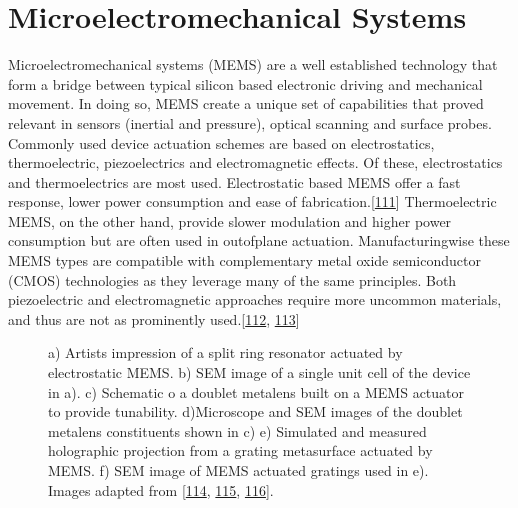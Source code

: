 \documentclass[a4paper,10pt,english,openany,oneside]{jupyterBook}
\begin{document}
\section{Micro\sphinxhyphen{}electromechanical Systems}
\label{\detokenize{sota:micro-electromechanical-systems}}
\sphinxAtStartPar
Micro\sphinxhyphen{}electromechanical systems (MEMS) are a well established technology that form a bridge between typical silicon based electronic driving and mechanical movement. In doing so, MEMS create a unique set of capabilities that proved relevant in sensors (inertial and pressure), optical scanning and surface probes. Commonly used device actuation schemes are based on electrostatics, thermoelectric, piezoelectrics and electromagnetic effects. Of these, electrostatics and thermoelectrics are most used. Electrostatic based MEMS offer a fast response, lower power consumption and ease of fabrication.{[}\hyperlink{cite.bib:id275}{111}{]} Thermoelectric MEMS, on the other hand, provide slower modulation and higher power consumption but are often used in out\sphinxhyphen{}of\sphinxhyphen{}plane actuation. Manufacturing\sphinxhyphen{}wise these MEMS types are compatible with complementary metal oxide semiconductor (CMOS) technologies as they leverage many of the same principles. Both piezoelectric and electromagnetic approaches require more uncommon materials, and thus are not as prominently used.{[}\hyperlink{cite.bib:id283}{112}, \hyperlink{cite.bib:id371}{113}{]}

\begin{figure}[htbp]
\centering
\capstart

\noindent{}
\caption{a) Artists impression of a split ring resonator actuated by electrostatic MEMS. b) SEM image of a single unit cell of the device in a). c) Schematic o a doublet metalens built on a MEMS actuator to provide tunability. d)Microscope and SEM images of the doublet metalens constituents shown in c) e) Simulated and measured holographic projection from a grating metasurface actuated by MEMS. f) SEM image of MEMS actuated gratings used in e). Images adapted from {[}\hyperlink{cite.bib:id68}{114}, \hyperlink{cite.bib:id277}{115}, \hyperlink{cite.bib:id37}{116}{]}.}\label{\detokenize{sota:chapter2-image16}}\end{figure}
\end{document}
